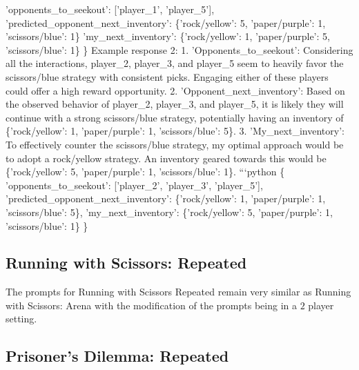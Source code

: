 \documentclass{article} %
\begin{document}
\begin{tcolorbox}[
    title={\small \textbf{ToM Module User Message 4}},
    width=\linewidth, %
    fontupper=\fontsize{9pt}{11pt}\selectfont\ttfamily %
]
              'opponents\_to\_seekout': ['player\_1', 'player\_5'],
              'predicted\_opponent\_next\_inventory': \{'rock/yellow': 5, 'paper/purple': 1, 'scissors/blue': 1\}
              'my\_next\_inventory': \{'rock/yellow': 1, 'paper/purple': 5, 'scissors/blue': 1\}
            \}
            Example response 2:
            1. 'Opponents\_to\_seekout': Considering all the interactions, player\_2, player\_3, and player\_5 seem to heavily favor the scissors/blue strategy with consistent picks. Engaging either of these players could offer a high reward opportunity.
            2. 'Opponent\_next\_inventory': Based on the observed behavior of player\_2, player\_3, and player\_5, it is likely they will continue with a strong scissors/blue strategy, potentially having an inventory of \{'rock/yellow': 1, 'paper/purple': 1, 'scissors/blue': 5\}.
            3. 'My\_next\_inventory': To effectively counter the scissors/blue strategy, my optimal approach would be to adopt a rock/yellow strategy. An inventory geared towards this would be \{'rock/yellow': 5, 'paper/purple': 1, 'scissors/blue': 1\}.
            ```python
            \{
              'opponents\_to\_seekout': ['player\_2', 'player\_3', 'player\_5'],
              'predicted\_opponent\_next\_inventory': \{'rock/yellow': 1, 'paper/purple': 1, 'scissors/blue': 5\},
              'my\_next\_inventory': \{'rock/yellow': 5, 'paper/purple': 1, 'scissors/blue': 1\}
            \}


\end{tcolorbox}

\subsection{Running with Scissors: Repeated}
The prompts for Running with Scissors Repeated remain very similar as Running with Scissors: Arena with the modification of the prompts being in a $2$ player setting.

\subsection{Prisoner's Dilemma: Repeated}
\vspace{-10pt} %
\end{document}
